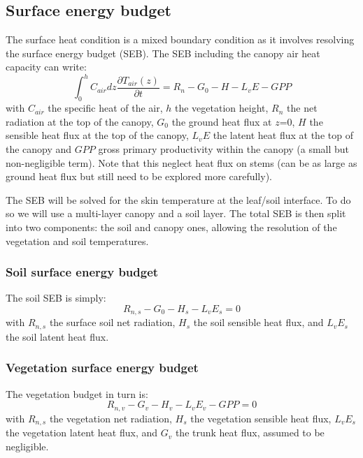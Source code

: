 \documentclass{article}
\begin{document}
\subsection{Surface energy budget}
The surface heat condition is a mixed boundary condition as it involves resolving the surface energy budget (SEB). The SEB including the canopy air heat capacity can write:
\begin{equation}
    \int_0^h{C_{air}dz \frac{\partial T_{air}(z)}{\partial t}} = R_n - G_0 - H - L_vE - GPP 
\end{equation}
with $C_{air}$ the specific heat of the air, $h$ the vegetation height, $R_n$ the net radiation at the top of the canopy, $G_0$ the ground heat flux at $z$=0, $H$ the sensible heat flux at the top of the canopy, $L_vE$ the latent heat flux at the top of the canopy and $GPP$ gross primary productivity within the canopy (a small but non-negligible term). Note that this neglect heat flux on stems (can be as large as ground heat flux but still need to be explored more carefully).

 The SEB will be solved for the skin temperature at the leaf/soil interface. To do so we will use a multi-layer canopy and a soil layer.
 The total SEB is then split into two components: the soil and canopy ones, allowing the resolution of the vegetation and soil temperatures.
 
\subsubsection{Soil surface energy budget}
The soil SEB is simply:
\begin{equation}
     R_{n,s} - G_0 - H_s - L_vE_s = 0  
     \label{SEB:soil}
\end{equation}
with $R_{n,s}$ the surface soil net radiation, $H_s$ the soil sensible heat flux, and $L_vE_s$ the soil latent heat flux.

\subsubsection{Vegetation surface energy budget}
The vegetation budget in turn is:
\begin{equation}
     R_{n,v} - G_v - H_v - L_vE_v - GPP = 0  
     \label{SEB:veg}
\end{equation}
with $R_{n,s}$ the vegetation net radiation, $H_s$ the vegetation sensible heat flux, $L_vE_s$ the vegetation latent heat flux, and $G_v$ the trunk heat flux, assumed to be negligible. 
\end{document}
